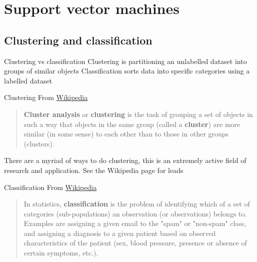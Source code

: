\documentclass[aspectratio=169]{beamer}\usepackage[]{graphicx}\usepackage[]{xcolor}
\begin{document}
\section{Support vector machines}

\subsection{Clustering and classification}

\begin{frame}{Clustering vs classification}
    Clustering is partitioning an unlabelled dataset into groups of similar objects
    \vfill
    Classification sorts data into specific categories using a labelled dataset
\end{frame}

\begin{frame}{Clustering}
    From \href{https://en.wikipedia.org/wiki/Cluster_analysis}{Wikipedia}
    \begin{quote}
        \textbf{Cluster analysis} or \textbf{clustering} is the task of grouping a set of objects in such a way that objects in the same group (called a \textbf{cluster}) are more similar (in some sense) to each other than to those in other groups (clusters).
    \end{quote}
    \vfill
    There are a myriad of ways to do clustering, this is an extremely active field of research and application. See the Wikipedia page for leads
\end{frame}


\begin{frame}{Classification}
    From \href{https://en.wikipedia.org/wiki/Statistical_classification}{Wikipedia}
    \begin{quote}
        In statistics, \textbf{classification} is the problem of identifying which of a set of categories (sub-populations) an observation (or observations) belongs to. Examples are assigning a given email to the "spam" or "non-spam" class, and assigning a diagnosis to a given patient based on observed characteristics of the patient (sex, blood pressure, presence or absence of certain symptoms, etc.).
    \end{quote}
\end{frame}
\end{document}
